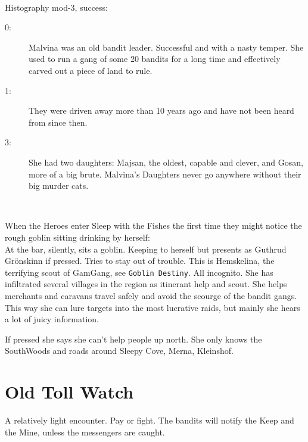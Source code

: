 \

\noindent
Histography mod-3, success:
\begin{description}
   \item[0:] Malvina was an old bandit leader. Successful and with a nasty temper. She used to run a gang of some 20 bandits for a long time and effectively carved out a piece of land to rule.
   \item[1:] They were driven away more than 10 years ago and have not been heard from since then.
   \item[3:] She had two daughters: Majsan, the oldest, capable and clever, and Gosan, more of a big brute. Malvina's Daughters never go anywhere without their big murder cats.
\end{description}

\

When the Heroes enter Sleep with the Fishes the first time they might notice the rough goblin sitting drinking by herself: \\
At the bar, silently, sits a goblin. Keeping to herself but presents as Guthrud Grönskinn if pressed. Tries to stay out of trouble. This is Hemskelina, the terrifying scout of GamGang, see \texttt{Goblin Destiny}. All incognito. She has infiltrated several villages in the region as itinerant help and scout. She helps merchants and caravans travel safely and avoid the scourge of the bandit gangs. This way she can lure targets into the most lucrative raids, but mainly she hears a lot of juicy information.

If pressed she says she can't help people up north. She only knows the SouthWoods and roads around Sleepy Cove, Merna, Kleinshof.








\section*{Old Toll Watch}
A relatively light encounter. Pay or fight. The bandits will notify the Keep and the Mine, unless the messengers are caught.


